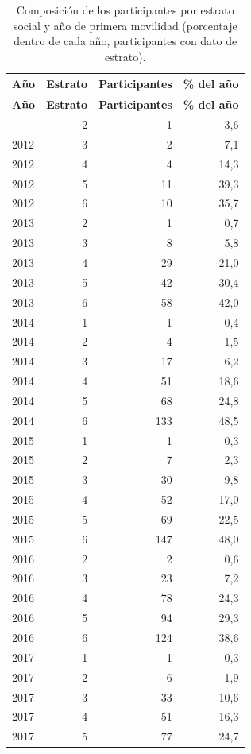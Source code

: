 \begin{longtable}{lrrr}
\caption{Composición de los participantes por estrato social y año de primera movilidad (porcentaje dentro de cada año, participantes con dato de estrato).}\label{tab:hist-estrato}\\
\toprule
\textbf{Año} & \textbf{Estrato} & \textbf{Participantes} & \textbf{\% del año} \\
\midrule
\endfirsthead
\toprule \textbf{Año} & \textbf{Estrato} & \textbf{Participantes} & \textbf{\% del año} \\
\midrule
\endhead
\bottomrule
\endfoot
2012 & 2 & 1 & 3,6 \\
2012 & 3 & 2 & 7,1 \\
2012 & 4 & 4 & 14,3 \\
2012 & 5 & 11 & 39,3 \\
2012 & 6 & 10 & 35,7 \\
2013 & 2 & 1 & 0,7 \\
2013 & 3 & 8 & 5,8 \\
2013 & 4 & 29 & 21,0 \\
2013 & 5 & 42 & 30,4 \\
2013 & 6 & 58 & 42,0 \\
2014 & 1 & 1 & 0,4 \\
2014 & 2 & 4 & 1,5 \\
2014 & 3 & 17 & 6,2 \\
2014 & 4 & 51 & 18,6 \\
2014 & 5 & 68 & 24,8 \\
2014 & 6 & 133 & 48,5 \\
2015 & 1 & 1 & 0,3 \\
2015 & 2 & 7 & 2,3 \\
2015 & 3 & 30 & 9,8 \\
2015 & 4 & 52 & 17,0 \\
2015 & 5 & 69 & 22,5 \\
2015 & 6 & 147 & 48,0 \\
2016 & 2 & 2 & 0,6 \\
2016 & 3 & 23 & 7,2 \\
2016 & 4 & 78 & 24,3 \\
2016 & 5 & 94 & 29,3 \\
2016 & 6 & 124 & 38,6 \\
2017 & 1 & 1 & 0,3 \\
2017 & 2 & 6 & 1,9 \\
2017 & 3 & 33 & 10,6 \\
2017 & 4 & 51 & 16,3 \\
2017 & 5 & 77 & 24,7 \\

\end{longtable}
